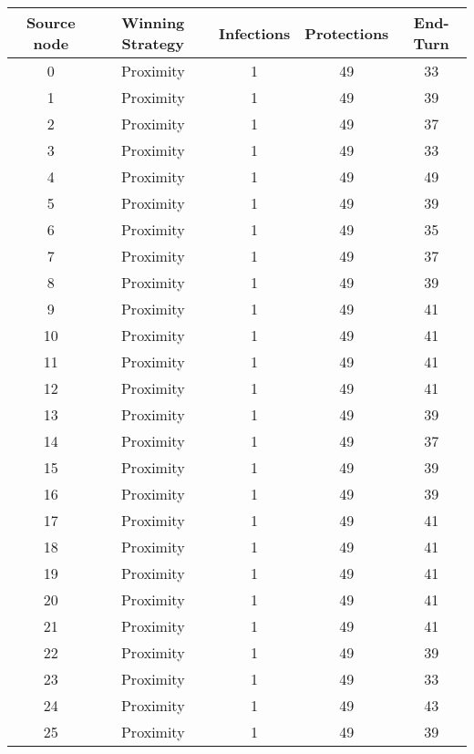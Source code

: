 \documentclass[results.tex]{subfiles}
\begin{document}
\begin{center}
  \begin{tabular}{| c || c | c | c | c |}
    \hline
    {\bfseries Source node} & {\bfseries Winning Strategy} & {\bfseries Infections} & {\bfseries Protections} & {\bfseries End-Turn} \\  %
    \hline\hline
    0 & Proximity & 1 & 49 & 33 \\ 
    \hline
    1 & Proximity & 1 & 49 & 39 \\ 
    \hline
    2 & Proximity & 1 & 49 & 37 \\ 
    \hline
    3 & Proximity & 1 & 49 & 33 \\ 
    \hline
    4 & Proximity & 1 & 49 & 49 \\ 
    \hline
    5 & Proximity & 1 & 49 & 39 \\ 
    \hline
    6 & Proximity & 1 & 49 & 35 \\ 
    \hline
    7 & Proximity & 1 & 49 & 37 \\ 
    \hline
    8 & Proximity & 1 & 49 & 39 \\ 
    \hline
    9 & Proximity & 1 & 49 & 41 \\ 
    \hline
    10 & Proximity & 1 & 49 & 41 \\ 
    \hline
    11 & Proximity & 1 & 49 & 41 \\ 
    \hline
    12 & Proximity & 1 & 49 & 41 \\ 
    \hline
    13 & Proximity & 1 & 49 & 39 \\ 
    \hline
    14 & Proximity & 1 & 49 & 37 \\ 
    \hline
    15 & Proximity & 1 & 49 & 39 \\ 
    \hline
    16 & Proximity & 1 & 49 & 39 \\ 
    \hline
    17 & Proximity & 1 & 49 & 41 \\ 
    \hline
    18 & Proximity & 1 & 49 & 41 \\ 
    \hline
    19 & Proximity & 1 & 49 & 41 \\ 
    \hline
    20 & Proximity & 1 & 49 & 41 \\ 
    \hline
    21 & Proximity & 1 & 49 & 41 \\ 
    \hline
    22 & Proximity & 1 & 49 & 39 \\ 
    \hline
    23 & Proximity & 1 & 49 & 33 \\ 
    \hline
    24 & Proximity & 1 & 49 & 43 \\ 
    \hline
    25 & Proximity & 1 & 49 & 39 \\ 

\end{tabular}
\end{center}
\end{document}
